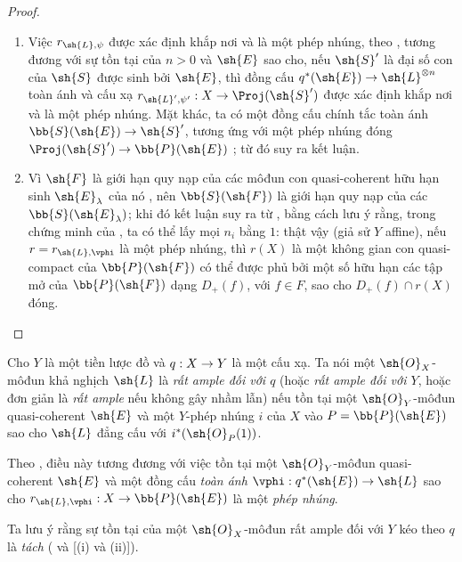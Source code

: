 \documentclass[oneside,10pt]{amsart}
\makeatletter
\newcommand{\ega@arrow}[2]{\mathchoice{#1}{#2}{#2}{#2}}
\renewcommand{\to}{\ega@arrow{\longrightarrow}{\rightarrow}}
\let\EGAOriginalLabel\label
\renewcommand{\label}[1]{\phantomsection\EGAOriginalLabel{#1}}
\makeatother
\begin{document}
\begin{proof}
\medskip\noindent
\begin{enumerate}
  \item[\rm{(i)}] Việc $r_{\sh{L},\psi}$ được xác định khắp nơi và là một phép nhúng, theo , tương đương với sự tồn tại của $n>0$ và $\sh{E}$ sao cho, nếu $\sh{S}'$ là đại số con của $\sh{S}$ được sinh bởi $\sh{E}$, thì đồng cấu $q^*(\sh{E})\to\sh{L}^{\otimes n}$ toàn ánh và cấu xạ $r_{\sh{L}',\psi'}:X\to\Proj(\sh{S}')$ được xác định khắp nơi và là một phép nhúng.
    Mặt khác, ta có một đồng cấu chính tắc toàn ánh $\bb{S}(\sh{E})\to\sh{S}'$, tương ứng với một phép nhúng đóng $\Proj(\sh{S}')\to\bb{P}(\sh{E})$ ;
    từ đó suy ra kết luận.
  \item[\rm{(ii)}] Vì $\sh{F}$ là giới hạn quy nạp của các môđun con quasi-coherent hữu hạn sinh $\sh{E}_\lambda$ của nó , nên $\bb{S}(\sh{F})$ là giới hạn quy nạp của các $\bb{S}(\sh{E}_\lambda)$;
    khi đó kết luận suy ra từ , bằng cách lưu ý rằng, trong chứng minh của , ta có thể lấy mọi $n_i$ bằng $1$:
    thật vậy (giả sử $Y$ affine), nếu $r=r_{\sh{L},\vphi}$ là một phép nhúng, thì $r(X)$ là một không gian con quasi-compact của $\bb{P}(\sh{F})$ có thể được phủ bởi một số hữu hạn các tập mở của $\bb{P}(\sh{F})$ dạng $D_+(f)$, với $f\in F$, sao cho $D_+(f)\cap r(X)$ đóng.
\end{enumerate}
\end{proof}

\begin{definition}[4.4.2]
\label{II.4.4.2}
Cho $Y$ là một tiền lược đồ và $q:X\to Y$ là một cấu xạ.
Ta nói một $\sh{O}_X$-môđun khả nghịch $\sh{L}$ là \emph{rất ample đối với $q$} (hoặc \emph{rất ample đối với $Y$}, hoặc đơn giản là \emph{rất ample} nếu không gây nhầm lẫn) nếu tồn tại một $\sh{O}_Y$-môđun quasi-coherent $\sh{E}$ và một $Y$-phép nhúng $i$ của $X$ vào $P=\bb{P}(\sh{E})$ sao cho $\sh{L}$ đẳng cấu với $i^*(\sh{O}_P(1))$.
\end{definition}

Theo , điều này tương đương với việc tồn tại một $\sh{O}_Y$-môđun quasi-coherent $\sh{E}$ và một đồng cấu \emph{toàn ánh} $\vphi:q^*(\sh{E})\to\sh{L}$ sao cho $r_{\sh{L},\vphi}:X\to\bb{P}(\sh{E})$ là một \emph{phép nhúng}.

Ta lưu ý rằng sự tồn tại của một $\sh{O}_X$-môđun rất ample đối với $Y$ kéo theo $q$ là \emph{tách} ( và [(i) và (ii)]).
\end{document}
